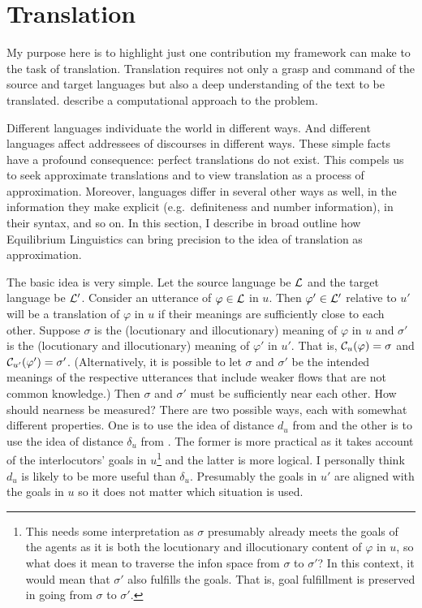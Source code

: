 \chapter{Translation} \label{ch:translation}

My purpose here is to highlight just one contribution my framework can make to the task of translation. Translation requires not only a grasp and command of the source and target languages but also a deep understanding of the text to be translated. \citet[Chapter~25]{jm:slp2} describe a computational approach to the problem.

Different languages individuate the world in different ways. And different languages affect addressees of discourses in different ways. These simple facts have a profound consequence: perfect translations do not exist. This compels us to seek approximate translations and to view translation as a process of approximation. Moreover, languages differ in several other ways as well, in the information they make explicit (e.g.\ definiteness and number information), in their syntax, and so on. In this section, I describe in broad outline how Equilibrium Linguistics can bring precision to the idea of translation as approximation.

The basic idea is very simple. Let the source language be ${\cal L}$ and the target language be ${\cal L}'$. Consider an utterance of $\varphi \in {\cal L}$ in $u$. Then $\varphi' \in {\cal L}'$ relative to $u'$ will be a translation of $\varphi$ in $u$ if their meanings are sufficiently close to each other. Suppose $\sigma$ is the (locutionary and illocutionary) meaning of $\varphi$ in $u$ and $\sigma'$ is the (locutionary and illocutionary) meaning of $\varphi'$ in $u'$. That is, ${\cal C}_u(\varphi) = \sigma$ and ${\cal C}_{u'}(\varphi') = \sigma'$. (Alternatively, it is possible to let $\sigma$ and $\sigma'$ be the intended meanings of the respective utterances that include weaker flows that are not common knowledge.) Then $\sigma$ and $\sigma'$ must be sufficiently near each other. How should nearness be measured? There are two possible ways, each with somewhat different properties. One is to use the idea of distance $d_u$ from  and the other is to use the idea of distance $\delta_u$ from . The former is more practical as it takes account of the interlocutors' goals in $u$\footnote{This needs some interpretation as $\sigma$ presumably already meets the goals of the agents as it is both the locutionary and illocutionary content of $\varphi$ in $u$, so what does it mean to traverse the infon space from $\sigma$ to $\sigma'$? In this context, it would mean that $\sigma'$ also fulfills the goals. That is, goal fulfillment is preserved in going from $\sigma$ to $\sigma'$.} and the latter is more logical. I personally think $d_u$ is likely to be more useful than $\delta_u$. Presumably the goals in $u'$ are aligned with the goals in $u$ so it does not matter which situation is used.

